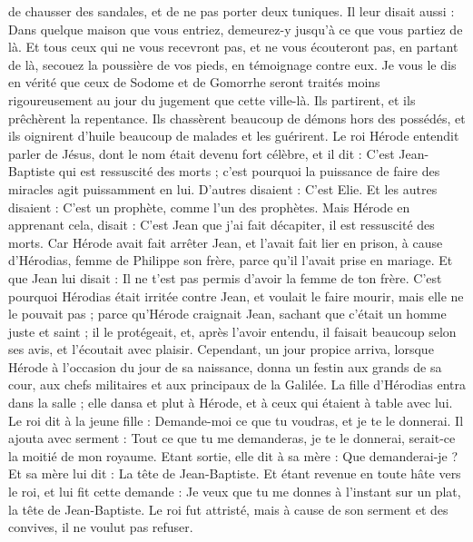 \begin{multicols}{2}
de chausser des sandales, et de ne pas porter deux tuniques.
Il leur disait aussi : Dans quelque maison que vous entriez, demeurez-y jusqu'à ce que vous partiez de là.
Et tous ceux qui ne vous recevront pas, et ne vous écouteront pas, en partant de là, secouez la poussière de vos pieds, en témoignage contre eux. Je vous le dis en vérité que ceux de Sodome et de Gomorrhe seront traités moins rigoureusement au jour du jugement que cette ville-là.
Ils partirent, et ils prêchèrent la repentance.
Ils chassèrent beaucoup de démons hors des possédés, et ils oignirent d'huile beaucoup de malades et les guérirent.
Le roi Hérode entendit parler de Jésus, dont le nom était devenu fort célèbre, et il dit : C’est Jean-Baptiste qui est ressuscité des morts ; c'est pourquoi la puissance de faire des miracles agit puissamment en lui.
D’autres disaient : C'est Elie. Et les autres disaient : C'est un prophète, comme l’un des prophètes.
Mais Hérode en apprenant cela, disait : C'est Jean que j'ai fait décapiter, il est ressuscité des morts.
Car Hérode avait fait arrêter Jean, et l'avait fait lier en prison, à cause d'Hérodias, femme de Philippe son frère, parce qu'il l'avait prise en mariage.
Et que Jean lui disait : Il ne t'est pas permis d'avoir la femme de ton frère.
C'est pourquoi Hérodias était irritée contre Jean, et voulait le faire mourir, mais elle ne le pouvait pas ;
parce qu’Hérode craignait Jean, sachant que c'était un homme juste et saint ; il le protégeait, et, après l’avoir entendu, il faisait beaucoup selon ses avis, et l’écoutait avec plaisir.
Cependant, un jour propice arriva, lorsque Hérode à l’occasion du jour de sa naissance, donna un festin aux grands de sa cour, aux chefs militaires et aux principaux de la Galilée.
La fille d'Hérodias entra dans la salle ; elle dansa et plut à Hérode, et à ceux qui étaient à table avec lui. Le roi dit à la jeune fille : Demande-moi ce que tu voudras, et je te le donnerai.
Il ajouta avec serment : Tout ce que tu me demanderas, je te le donnerai, serait-ce la moitié de mon royaume.
Etant sortie, elle dit à sa mère : Que demanderai-je ? Et sa mère lui dit : La tête de Jean-Baptiste.
Et étant revenue en toute hâte vers le roi, et lui fit cette demande : Je veux que tu me donnes à l’instant sur un plat, la tête de Jean-Baptiste.
Le roi fut attristé, mais à cause de son serment et des convives, il ne voulut pas refuser.

\end{multicols}
